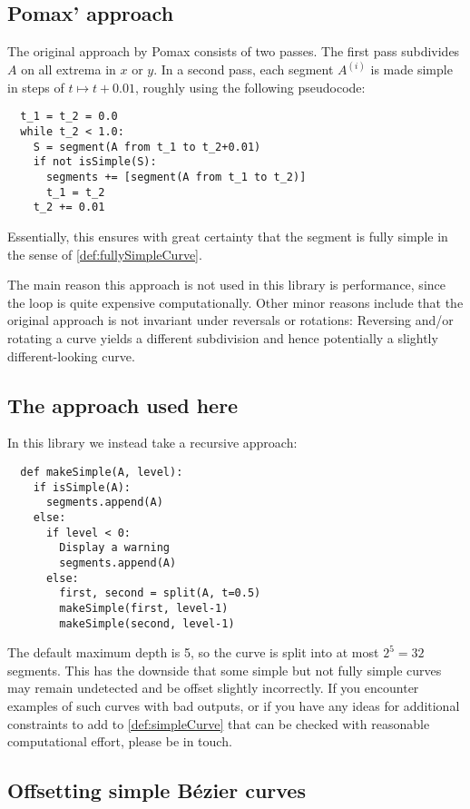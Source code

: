 \documentclass[12pt,a4paper]{article}
\theoremstyle{definition}
\begin{document}
\subsection{Pomax' approach}
The original approach by Pomax consists of two passes. The first pass subdivides $A$ on all extrema in $x$ or $y$. In a second pass, each segment $A^{(i)}$ is made simple in steps of $t \mapsto t + 0.01$, roughly using the following pseudocode:
\begin{samepage}
\begin{verbatim}
  t_1 = t_2 = 0.0
  while t_2 < 1.0:
    S = segment(A from t_1 to t_2+0.01)
    if not isSimple(S):
      segments += [segment(A from t_1 to t_2)]
      t_1 = t_2
    t_2 += 0.01
\end{verbatim}
\end{samepage}
Essentially, this ensures with great certainty that the segment is fully simple in the sense of \cref{def:fullySimpleCurve}.

The main reason this approach is not used in this library is performance, since the loop is quite expensive computationally. Other minor reasons include that the original approach is not invariant under reversals or rotations: Reversing and/or rotating a curve yields a different subdivision and hence potentially a slightly different-looking curve.

\subsection{The approach used here}
\label{subsec:subdivisionUsed}
In this library we instead take a recursive approach:
\begin{verbatim}
  def makeSimple(A, level):
    if isSimple(A):
      segments.append(A)
    else:
      if level < 0:
        Display a warning
        segments.append(A)
      else:
        first, second = split(A, t=0.5)
        makeSimple(first, level-1)
        makeSimple(second, level-1)
\end{verbatim}
The default maximum depth is 5, so the curve is split into at most $2^5 = 32$ segments. This has the downside that some simple but not fully simple curves may remain undetected and be offset slightly incorrectly. If you encounter examples of such curves with bad outputs, or if you have any ideas for additional constraints to add to \cref{def:simpleCurve} that can be checked with reasonable computational effort, please be in touch.


\subsection{Offsetting simple Bézier curves}
\end{document}
